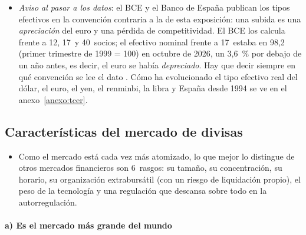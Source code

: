 \documentclass[11pt]{article}
\begin{document}
\begin{itemize}
\item \emph{Aviso al pasar a los datos}: el BCE y el Banco de España publican los tipos efectivos en la convención contraria a la de esta exposición: una subida es una \emph{apreciación} del euro y una pérdida de competitividad. El BCE los calcula frente a 12, 17~y 40~socios; el efectivo nominal frente a 17~estaba en 98,2 (primer trimestre de 1999 = 100) en octubre de 2026, un 3,6~\% por debajo de un año antes, es decir, el euro se había \emph{depreciado}\nocite{BCE2026TCE}. Hay que decir siempre en qué convención se lee el dato . Cómo ha evolucionado el tipo efectivo real del dólar, el euro, el yen, el renminbi, la libra y España desde 1994 se ve en el anexo~\ref{anexo:tcer}.
\end{itemize}

\subsection{Características del mercado de divisas}\label{sec:caracteristicas}

\begin{itemize}
\item Como el mercado está cada vez más atomizado, lo que mejor lo distingue de otros mercados financieros son 6~rasgos: su tamaño, su concentración, su horario, su organización extrabursátil (con un riesgo de liquidación propio), el peso de la tecnología y una regulación que descansa sobre todo en la autorregulación.
\end{itemize}

\paragraph{a) Es el mercado más grande del mundo}
\end{document}
